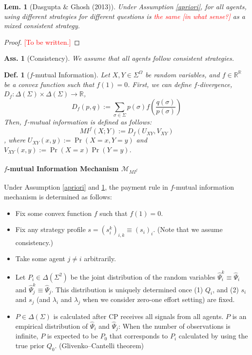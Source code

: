 \documentclass[11pt,a4paper,dvipdfmx]{article}
\theoremstyle{plain}
\newtheorem{lem}{Lem.}[section]
\newtheorem{df}{Def.}[section]
\newtheorem{ass}{Ass.}
\newcommand{\R}{\mathbb{R}}
\newcommand{\mM}{\mathcal{M}}
\renewcommand{\hat}{\widehat}
\newcommand{\1}{\mathbbm{1}}
\newcommand{\ocomment}[1]{{\textcolor{red}{#1}}}
\begin{document}
\begin{lem}[Dasgupta \& Ghosh (2013)]
	Under Assumption \ref{apriori}, for all agents, using different strategies for different questions is \ocomment{the same [in what sense?]} as a mixed consistent strategy.
\end{lem}
\begin{proof}
	\ocomment{[To be written.]}
\end{proof}

\begin{ass}[Consistency] \label{consistency}
	We assume that all agents follow consistent strategies.
\end{ass}

\begin{screen}
\begin{df}[$f$-mutual Information]
	Let $X,Y \in \Sigma^\Omega$ be random variables, and $f \in \R^\R$ be a convex function such that $f(1) = 0$. First, we can define $f$-divergence, $D_f: \Delta(\Sigma) \times \Delta(\Sigma) \to \R$,
	$$
	D_f(p,q) := \sum_{\sigma \in \Sigma} p(\sigma) f \left( \frac{q(\sigma)}{p(\sigma)}\right)
	$$
	Then, $f$-mutual information is defined as follows:
	$$
	MI^f(X; Y) := D_f(U_{XY}, V_{XY})
	$$
	, where $U_{XY}(x,y) := \Pr(X=x, Y=y)$ and $V_{XY}(x,y) := \Pr(X=x) \Pr(Y=y)$.
\end{df}	
\end{screen}


\paragraph{$f$-mutual Information Mechanism $\mM_{MI^f}$}
Under Assumption \ref{apriori} and \ref{consistency}, the payment rule in $f$-mutual information mechanism is determined as follows:
\begin{itemize}
	\item Fix some convex function $f$ such that $f(1)=0$.
	\item Fix any strategy profile $s = (s_i^k)_{i,k} \equiv (s_i)_i$. (Note that we assume consistency.)
	\item Take some agent $j \neq i$ arbitrarily.
	\item Let $P_i \in \Delta(\Sigma^2)$ be the joint distribution of the random variables $\hat{\Psi}_i^k \equiv \hat{\Psi}_i$ and $\hat{\Psi}_j^k \equiv \hat{\Psi}_j$. This distribution is uniquely determined once (1) $Q_i$, and (2) $s_i$ and $s_j$ (and $\lambda_i$ and $\lambda_j$ when we consider zero-one effort setting) are fixed.
	\item $P \in \Delta(\Sigma)$ is calculated after CP receives all signals from all agents. $P$ is an empirical distribution of $\hat{\Psi}_i$ and $\hat{\Psi}_j$: When the number of observations is infinite,  $P$ is expected to be $P_0$ that corresponds to $P_i$ calculated by using the true prior $Q_0$.
	(Glivenko–Cantelli theorem)
\end{itemize}
\end{document}
